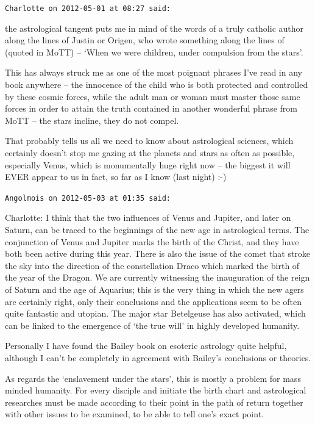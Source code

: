 \begin{footnotesize}
\begin{sffamily}
\hfill

\texttt{Charlotte on 2012-05-01 at 08:27 said:}

the astrological tangent puts me in mind of the words of a truly catholic author along the lines of Justin or Origen, who wrote something along the lines of (quoted in MoTT) -- `When we were children, under compulsion from the stars'.

This has always struck me as one of the most poignant phrases I've read in any book anywhere -- the innocence of the child who is both protected and controlled by these cosmic forces, while the adult man or woman must master those same forces in order to attain the truth contained in another wonderful phrase from MoTT -- the stars incline, they do not compel.

That probably tells us all we need to know about astrological sciences, which certainly doesn't stop me gazing at the planets and stars as often as possible, especially Venus, which is monumentally huge right now -- the biggest it will EVER appear to us in fact, so far as I know (last night) :-)

\hfill

\texttt{Angolmois on 2012-05-03 at 01:35 said:}

Charlotte: I think that the two influences of Venus and Jupiter, and later on Saturn, can be traced to the beginnings of the new age in astrological terms. The conjunction of Venus and Jupiter marks the birth of the Christ, and they have both been active during this year. There is also the issue of the comet that stroke the sky into the direction of the constellation Draco which marked the birth of the year of the Dragon. We are currently witnessing the inauguration of the reign of Saturn and the age of Aquarius; this is the very thing in which the new agers are certainly right, only their conclusions and the applications seem to be often quite fantastic and utopian. The major star Betelgeuse has also activated, which can be linked to the emergence of `the true will' in highly developed humanity.

Personally I have found the Bailey book on esoteric astrology quite helpful, although I can't be completely in agreement with Bailey's conclusions or theories.

As regards the `enslavement under the stars', this is mostly a problem for mass minded humanity. For every disciple and initiate the birth chart and astrological researches must be made according to their point in the path of return together with other issues to be examined, to be able to tell one's exact point.


\end{sffamily}
\end{footnotesize}
